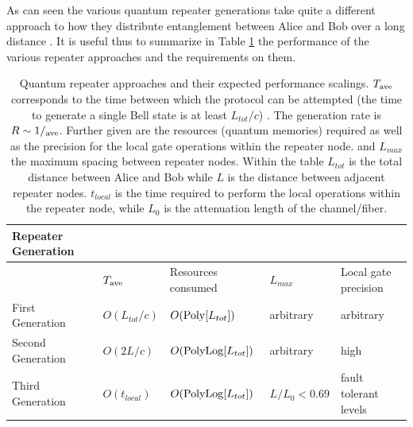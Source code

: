 \documentclass[twocolumn, aps, rmp, amsmath, amssymb, nofootinbib, superscriptaddress, longbibliography, floatfix, table-of-contents, eqsecnum]{revtex4-1}
\begin{document}
As can seen the various quantum repeater generations take quite a different approach to how they distribute entanglement between Alice and Bob over a long distance \cite{Muralidharan2016}. It is useful thus to  summarize in Table \ref{qtable} the performance of the various repeater approaches and the requirements on them.
\begin{widetext}
\begin{center}
\begin{table}[h]
\centering
\begin{tabular}{ccccc}
\hline \hline
\multicolumn{1}{|l|}{\bf Repeater Generation} &  \multicolumn{1}{l|}{} &  \multicolumn{1}{l|}{}    &  \multicolumn{1}{l|}{}    &\multicolumn{1}{l|}{}    \\ \hline
\multicolumn{1}{|l|}{} & \multicolumn{1}{l|}{\rm $T_{\rm ave}$}   & \multicolumn{1}{l|}{\rm Resources consumed}    & \multicolumn{1}{l|}{\rm  $L_{max}$}     & \multicolumn{1}{l|}{\rm  Local gate precision}     \\ \hline
\multicolumn{1}{|l|}{First Generation}    & \multicolumn{1}{l|}{$O(L_{tot}/c)$} & \multicolumn{1}{l|}{$O({\rm Poly}[L_{tot}])$} & \multicolumn{1}{l|}{\rm arbitrary}  & \multicolumn{1}{l|}{\rm arbitrary}    \\ \hline
\multicolumn{1}{|l|}{Second Generation}   & \multicolumn{1}{l|}{$O(2 L/c)$}     & \multicolumn{1}{l|}{$O({\rm PolyLog}[L_{tot}])$} & \multicolumn{1}{l|}{\rm arbitrary}  & \multicolumn{1}{l|}{\rm high}   \\ \hline
\multicolumn{1}{|l|}{Third Generation}   & \multicolumn{1}{l|}{$O(t_{local})$}     & \multicolumn{1}{l|}{$O({\rm PolyLog}[L_{tot}])$} & \multicolumn{1}{l|}{$L/L_0<0.69$}   & \multicolumn{1}{l|}{\rm fault tolerant levels}   \\
\hline \hline
\end{tabular}
\caption{Quantum repeater approaches and their expected performance scalings.  $T_{\rm ave}$ corresponds to the time between which the protocol can be attempted (the time to generate a single Bell state is at least $L_{tot}/c$) \cite{Muralidharan2016}. The generation rate is $R\sim 1/ _{\rm ave}$. Further given are the resources (quantum memories) required as well as the precision for the local gate operations within the repeater node. and $L_{max}$ the maximum spacing between repeater nodes. Within the table  $L_{tot}$ is the total distance between Alice and Bob while $L$ is the distance between adjacent repeater nodes. $t_{local}$ is the time required to perform the local operations within the repeater node, while $L_0$ is the attenuation length of the channel/fiber.}
\label{qtable}
\end{table}
\end{center}
\end{widetext}
\end{document}
